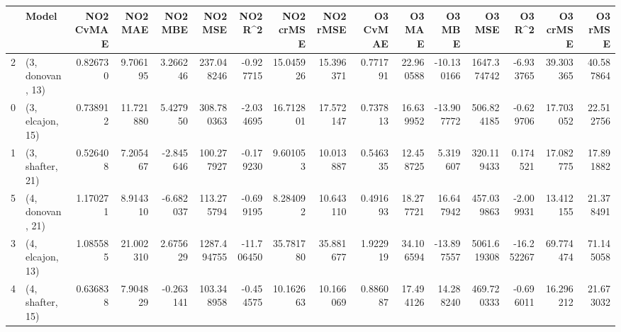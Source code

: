 \begin{tabular}{llrrrrrrrrrrrrrr}
\toprule
{} &             Model &  NO2 CvMAE &    NO2 MAE &   NO2 MBE &      NO2 MSE &    NO2 R\textasciicircum2 &  NO2 crMSE &   NO2 rMSE &  O3 CvMAE &     O3 MAE &     O3 MBE &       O3 MSE &     O3 R\textasciicircum2 &   O3 crMSE &    O3 rMSE \\
\midrule
2 &  (3, donovan, 13) &   0.826730 &   9.706195 &  3.266246 &   237.048246 &  -0.927715 &  15.045926 &  15.396371 &  0.771791 &  22.960588 & -10.130166 &  1647.374742 &  -6.933765 &  39.303365 &  40.587864 \\
0 &  (3, elcajon, 15) &   0.738912 &  11.721880 &  5.427950 &   308.780363 &  -2.034695 &  16.712801 &  17.572147 &  0.737813 &  16.639952 & -13.907772 &   506.824185 &  -0.629706 &  17.703052 &  22.512756 \\
1 &  (3, shafter, 21) &   0.526408 &   7.205467 & -2.845646 &   100.277927 &  -0.179230 &   9.601053 &  10.013887 &  0.546335 &  12.458725 &   5.319607 &   320.119433 &   0.174521 &  17.082775 &  17.891882 \\
5 &  (4, donovan, 21) &   1.170271 &   8.914310 & -6.682037 &   113.275794 &  -0.699195 &   8.284092 &  10.643110 &  0.491693 &  18.277721 &  16.647942 &   457.039863 &  -2.009931 &  13.412155 &  21.378491 \\
3 &  (4, elcajon, 13) &   1.085585 &  21.002310 &  2.675629 &  1287.494755 & -11.706450 &  35.781780 &  35.881677 &  1.922919 &  34.106594 & -13.897557 &  5061.619308 & -16.252267 &  69.774474 &  71.145058 \\
4 &  (4, shafter, 15) &   0.636838 &   7.904829 & -0.263141 &   103.348958 &  -0.454575 &  10.162663 &  10.166069 &  0.886087 &  17.494126 &  14.288240 &   469.720333 &  -0.696011 &  16.296212 &  21.673032 \\
\bottomrule
\end{tabular}
